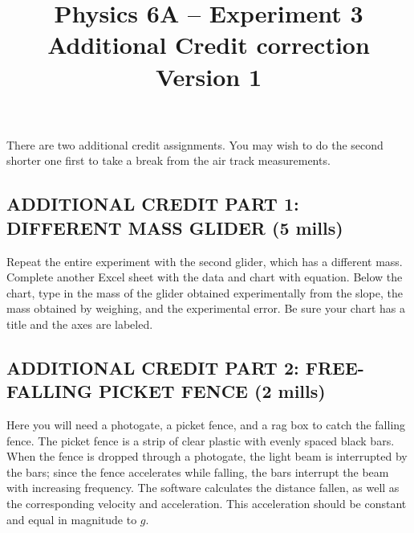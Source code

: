 \documentclass{article}
\title{Physics 6A -- Experiment 3\\ {\Large Additional Credit correction}
	\\ {\normalsize Version 1}}
\date{}
\begin{document}
\maketitle


There are two additional credit assignments.  You may wish to do the second shorter one first to take a break from the air track measurements.

\subsection*{ADDITIONAL CREDIT PART 1: DIFFERENT MASS GLIDER (5 mills)}

Repeat the entire experiment with the second glider, which has a different mass.  Complete another Excel sheet with the data and chart with equation.  Below the chart, type in the mass of the glider obtained experimentally from the slope, the mass obtained by weighing, and the experimental error.  Be sure your chart has a title and the axes are labeled.

\begin{comment}
\subsection*{ADDITIONAL CREDIT PART 2: DIFFERENT METHODS OF STARTING THE GLIDER (2 mills)}

When the air pump is first turned on, there may be some friction between the track and the glider, since it takes a few moments for the pressure to reach its maximum value.  Try several runs in which the glider is released a few seconds after the maximum air pressure has been attained, and several runs in which air causes the glider to ``float'' up the track before it begins to accelerate downward.  Is there any systematic difference in the data obtained from the two methods?  Which method produces results that agree more closely with Newton's Second Law?  Explain what you are doing, and record your measurements and conclusions.
\end{comment}

\subsection*{ADDITIONAL CREDIT PART 2: FREE-FALLING PICKET FENCE \bf{(2 mills)}}

Here you will need a photogate, a picket fence, and a rag box to catch the falling fence.  The picket fence is a strip of clear plastic with evenly spaced black bars.  When the fence is dropped through a photogate, the light beam is interrupted by the bars; since the fence accelerates while falling, the bars interrupt the beam with increasing frequency.  The software calculates the distance fallen, as well as the corresponding velocity and acceleration.  This acceleration should be constant and equal in magnitude to \(g\).
\end{document}

